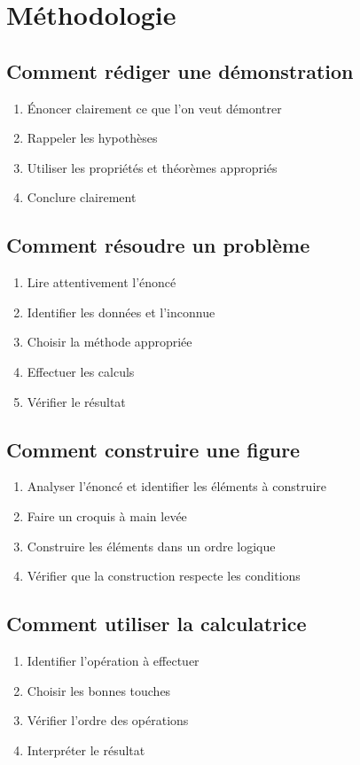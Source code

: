 \chapter{Méthodologie}

\section{Comment rédiger une démonstration}
\begin{enumerate}
  \item Énoncer clairement ce que l'on veut démontrer
  \item Rappeler les hypothèses
  \item Utiliser les propriétés et théorèmes appropriés
  \item Conclure clairement
\end{enumerate}

\section{Comment résoudre un problème}
\begin{enumerate}
  \item Lire attentivement l'énoncé
  \item Identifier les données et l'inconnue
  \item Choisir la méthode appropriée
  \item Effectuer les calculs
  \item Vérifier le résultat
\end{enumerate}

\section{Comment construire une figure}
\begin{enumerate}
  \item Analyser l'énoncé et identifier les éléments à construire
  \item Faire un croquis à main levée
  \item Construire les éléments dans un ordre logique
  \item Vérifier que la construction respecte les conditions
\end{enumerate}

\section{Comment utiliser la calculatrice}
\begin{enumerate}
  \item Identifier l'opération à effectuer
  \item Choisir les bonnes touches
  \item Vérifier l'ordre des opérations
  \item Interpréter le résultat
\end{enumerate} 